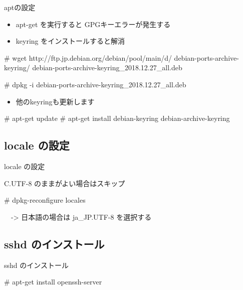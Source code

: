 \begin{frame}[containsverbatim]{aptの設定}

\begin{itemize}
\item apt-get を実行すると GPGキーエラーが発生する
\item keyring をインストールすると解消
\end{itemize}
  
\begin{commandlinesmall}
# wget http://ftp.jp.debian.org/debian/pool/main/d/
debian-ports-archive-keyring/
debian-ports-archive-keyring_2018.12.27_all.deb

# dpkg -i debian-ports-archive-keyring_2018.12.27_all.deb
\end{commandlinesmall}

\begin{itemize}
\item 他のkeyringも更新します
\end{itemize}

\begin{commandlinesmall}
# apt-get update
# apt-get install debian-keyring debian-archive-keyring  
\end{commandlinesmall}

\end{frame}


\subsection{locale の設定}
\begin{frame}[containsverbatim]{locale の設定}

C.UTF-8 のままがよい場合はスキップ
  
\begin{commandlinesmall}
# dpkg-reconfigure locales

　-> 日本語の場合は ja_JP.UTF-8 を選択する
\end{commandlinesmall}

\end{frame}


\subsection{sshd のインストール}
\begin{frame}[containsverbatim]{sshd のインストール}

\begin{commandlinesmall}
# apt-get install openssh-server
\end{commandlinesmall}

\end{frame}


